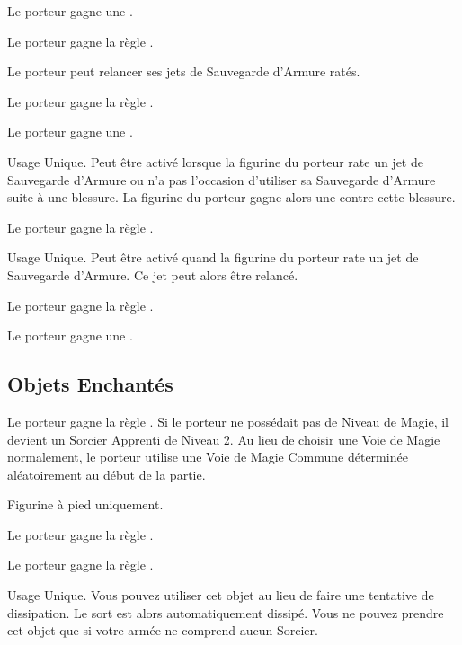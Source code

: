 Le porteur gagne une .

Le porteur gagne la règle .

Le porteur peut relancer ses jets de Sauvegarde d'Armure ratés.

Le porteur gagne la règle .

Le porteur gagne une .

Usage Unique. Peut être activé lorsque la figurine du porteur rate un jet de Sauvegarde d'Armure ou n'a pas l'occasion d'utiliser sa Sauvegarde d'Armure suite à une blessure. La figurine du porteur gagne alors une  contre cette blessure.

Le porteur gagne la règle .

Usage Unique. Peut être activé quand la figurine du porteur rate un jet de Sauvegarde d'Armure. Ce jet peut alors être relancé.

Le porteur gagne la règle \fireborn{}.

Le porteur gagne une .

\endpricelist

\newpage
\subsection{Objets Enchantés}

\startpricelist

Le porteur gagne la règle \stupidity{}. Si le porteur ne possédait pas de Niveau de Magie, il devient un Sorcier Apprenti de Niveau 2. Au lieu de choisir une Voie de Magie normalement, le porteur utilise une Voie de Magie Commune déterminée aléatoirement au début de la partie.

Figurine à pied uniquement.

Le porteur gagne la règle .

Le porteur gagne la règle \lightningreflexes{}.

Usage Unique. Vous pouvez utiliser cet objet au lieu de faire une tentative de dissipation. Le sort est alors automatiquement dissipé. Vous ne pouvez prendre cet objet que si votre armée ne comprend aucun Sorcier.


